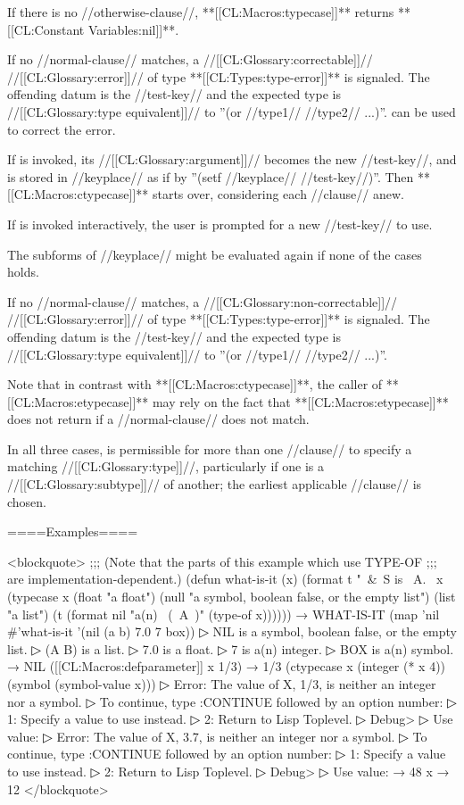 If there is no //otherwise-clause//, **[[CL:Macros:typecase]]** returns **[[CL:Constant Variables:nil]]**.


If no //normal-clause// matches, a //[[CL:Glossary:correctable]]// //[[CL:Glossary:error]]// of type **[[CL:Types:type-error]]** is signaled. The offending datum is the //test-key// and the expected type is //[[CL:Glossary:type equivalent]]// to ''(or //type1// //type2// ...)''.  can be used to correct the error.

If  is invoked, its //[[CL:Glossary:argument]]// becomes the new //test-key//, and is stored in //keyplace// as if by ''(setf //keyplace// //test-key//)''. Then **[[CL:Macros:ctypecase]]** starts over, considering each //clause// anew.

If  is invoked interactively, the user is prompted for a new //test-key// to use.

The subforms of //keyplace// might be evaluated again if none of the cases holds.


If no //normal-clause// matches, a //[[CL:Glossary:non-correctable]]// //[[CL:Glossary:error]]// of type **[[CL:Types:type-error]]** is signaled. The offending datum is the //test-key// and the expected type is //[[CL:Glossary:type equivalent]]// to ''(or //type1// //type2// ...)''.

Note that in contrast with **[[CL:Macros:ctypecase]]**, the caller of **[[CL:Macros:etypecase]]** may rely on the fact that **[[CL:Macros:etypecase]]** does not return if a //normal-clause// does not match.

\endlist

In all three cases, is permissible for more than one //clause// to specify a matching //[[CL:Glossary:type]]//, particularly if one is a //[[CL:Glossary:subtype]]// of another; the earliest applicable //clause// is chosen.

====Examples====

<blockquote> ;;; (Note that the parts of this example which use TYPE-OF ;;; are implementation-dependent.) (defun what-is-it (x) (format t "~&~S is ~A.~ x (typecase x (float "a float") (null "a symbol, boolean false, or the empty list") (list "a list") (t (format nil "a(n) ~(~A~)" (type-of x)))))) → WHAT-IS-IT (map 'nil #'what-is-it '(nil (a b) 7.0 7 box))
▷ NIL is a symbol, boolean false, or the empty list.
▷ (A B) is a list.
▷ 7.0 is a float.
▷ 7 is a(n) integer.
▷ BOX is a(n) symbol. → NIL ([[CL:Macros:defparameter]] x 1/3) → 1/3 (ctypecase x (integer (* x 4)) (symbol (symbol-value x)))
▷ Error: The value of X, 1/3, is neither an integer nor a symbol.
▷ To continue, type :CONTINUE followed by an option number:
▷ 1: Specify a value to use instead.
▷ 2: Return to Lisp Toplevel.
▷ Debug> 
▷ Use value: 
▷ Error: The value of X, 3.7, is neither an integer nor a symbol.
▷ To continue, type :CONTINUE followed by an option number:
▷ 1: Specify a value to use instead.
▷ 2: Return to Lisp Toplevel.
▷ Debug> 
▷ Use value:  → 48 x → 12 </blockquote>

